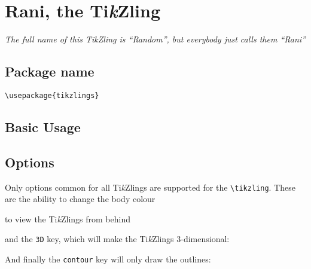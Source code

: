 \documentclass[parskip=half]{scrartcl}
\newcommand{\tikzlings}{Ti\emph{k}Zlings\xspace}
\begin{document}
\section[Ti\emph{k}Zling]{Rani, the Ti\emph{k}Zling}

\emph{The full name of this Ti\emph{k}Zling is ``Random'', but everybody just calls them ``Rani''}

\subsection{Package name}

\begin{tcolorbox}[lower separated=false, lefthand width=.8\linewidth]
\vspace*{0.5cm}
\lstinline|\usepackage{tikzlings}|
\vspace*{0.5cm}
\end{tcolorbox}

\subsection{Basic Usage}

\begin{tcblisting}{}
\tikzling
\end{tcblisting}

\subsection{Options}

Only options common for all \tikzlings are supported for the \lstinline|\tikzling|. These are the ability to change the body colour
\begin{tcblisting}{}
\tikzling[body=blue]
\end{tcblisting}

to view the \tikzlings from behind
\begin{tcblisting}{}
\tikzling[back]
\end{tcblisting}

and the \lstinline|3D| key, which will make the Ti\emph{k}Zlings 3-dimensional:
\begin{tcblisting}{}
\tikzling[3D]
\end{tcblisting}

And finally the \lstinline|contour| key will only draw the outlines:
\begin{tcblisting}{}
\tikzling[contour=black]
\end{tcblisting}
\end{document}
